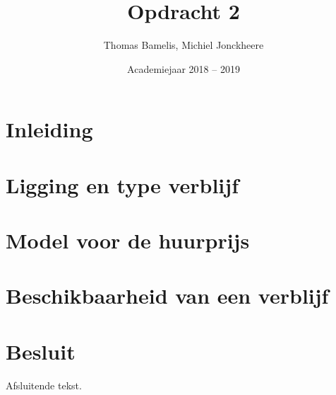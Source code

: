 \documentclass[a4paper,kulak]{kulakarticle} %
\date{Academiejaar 2018 -- 2019}
\title{Opdracht 2}
\author{Thomas Bamelis, Michiel Jonckheere}
\begin{document}
\maketitle

\section*{Inleiding}

\section{Ligging en type verblijf}

\section{Model voor de huurprijs}

\section{Beschikbaarheid van een verblijf}


\section*{Besluit}

Afsluitende tekst.
\end{document}
